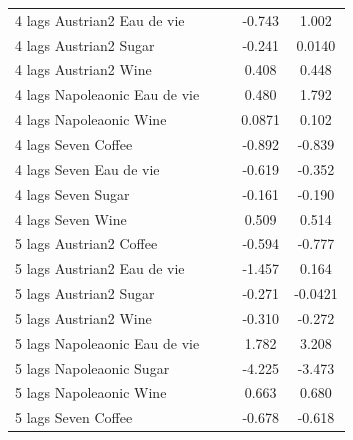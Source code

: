 \documentclass[12pt,a4paper,titlepage]{article}
\begin{document}
{\begin{longtable}{l*{4}{c}}
4 lags Austrian2 Eau de vie&                     &                     &      -0.743\sym{*}  &       1.002         \\
4 lags Austrian2 Sugar&                     &                     &      -0.241         &      0.0140         \\
4 lags Austrian2 Wine&                     &                     &       0.408         &       0.448         \\
4 lags Napoleaonic Eau de vie&                     &                     &       0.480         &       1.792         \\
4 lags Napoleaonic Wine&                     &                     &      0.0871         &       0.102         \\
4 lags Seven Coffee &                     &                     &      -0.892\sym{***}&      -0.839\sym{***}\\
4 lags Seven Eau de vie&                     &                     &      -0.619\sym{***}&      -0.352         \\
4 lags Seven Sugar  &                     &                     &      -0.161\sym{*}  &      -0.190\sym{*}  \\
4 lags Seven Wine   &                     &                     &       0.509\sym{***}&       0.514\sym{***}\\
5 lags Austrian2 Coffee&                     &                     &      -0.594\sym{***}&      -0.777\sym{***}\\
5 lags Austrian2 Eau de vie&                     &                     &      -1.457\sym{***}&       0.164         \\
5 lags Austrian2 Sugar&                     &                     &      -0.271\sym{*}  &     -0.0421         \\
5 lags Austrian2 Wine&                     &                     &      -0.310         &      -0.272         \\
5 lags Napoleaonic Eau de vie&                     &                     &       1.782         &       3.208         \\
5 lags Napoleaonic Sugar&                     &                     &      -4.225\sym{***}&      -3.473\sym{***}\\
5 lags Napoleaonic Wine&                     &                     &       0.663\sym{*}  &       0.680         \\
5 lags Seven Coffee &                     &                     &      -0.678\sym{***}&      -0.618\sym{***}\\

\end{longtable}}
\end{document}
